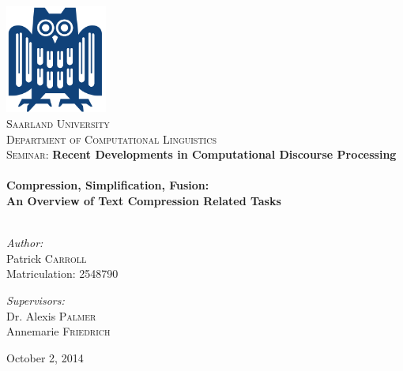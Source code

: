 \begin{titlepage}
\begin{center}

\includegraphics[width=0.25\textwidth]{./eule}~\\[1cm]

\textsc{\LARGE Saarland  University}\\[0.4cm]
\textsc{\Large Department of Computational Linguistics}\\[1.5cm]

\textsc{\Large Seminar:} \textbf{\Large Recent Developments in Computational Discourse Processing}\\[0.5cm]

\HRule \\[1.0cm]

{ \Large \bfseries Compression, Simplification, Fusion:}\\[0.4cm]
{ \bfseries An Overview of Text Compression Related Tasks}\\[0.3cm]

\HRule \\[1.5cm]

\begin{minipage}{0.4\textwidth}
\begin{flushleft} \large
\emph{Author:}\\
Patrick \textsc{Carroll}\\
Matriculation: 2548790
\end{flushleft}
\end{minipage}
\begin{minipage}{0.4\textwidth}
\begin{flushright} \large
\emph{Supervisors:} \\
Dr. Alexis \textsc{Palmer}\\
Annemarie \textsc{Friedrich}\\
\end{flushright}
\end{minipage}

\vfill

{\large October 2, 2014}

\end{center}
\end{titlepage}
